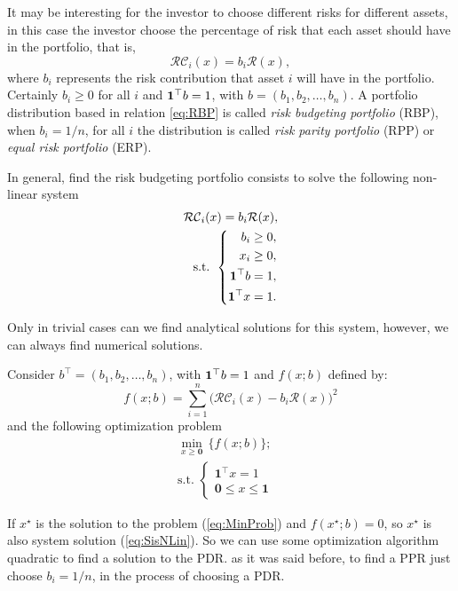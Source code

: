 It may be interesting for the investor to choose different risks for different assets, in this case the investor choose the percentage of risk that each asset should have in the portfolio, that is,
\begin{equation}\label{eq:RBP}
	\mathcal{RC}_i(x)=b_i\mathcal{R}(x),
\end{equation}
where $b_i$ represents the risk contribution that asset $i$ will have in the portfolio. Certainly $b_i\geq 0$ for all $i$ and
${\bf 1}^\top b =1$, with $b=(b_1, b_2, \dots, b_n)$. A portfolio distribution based in relation \eqref{eq:RBP} is called \textit{risk budgeting portfolio} (RBP), when $b_i=1/n$, for all $i$ the distribution is called \textit{risk parity portfolio} (RPP) or \textit{equal risk portfolio} (ERP).

In general, find the risk budgeting portfolio consists to solve the following non-linear system
\begin{eqnarray}\label{eq:SisNLin}
\mathcal{RC}_i(x)=b_i\mathcal{R}(x), \\
	\mbox{s.t. }\left\{
	\begin{aligned}\nonumber
b_i \geq 0, \\
x_i \geq 0, \\
{\bf 1}^\top b =1, \\
{\bf 1}^\top x =1.
	\end{aligned}
	\right.
\end{eqnarray}




Only in trivial cases can we find analytical solutions for this system, however, we can always find numerical solutions.

Consider $b^\top = (b_1, b_2, \dots, b_n)$, with ${\bf 1}^\top b =1$ and $f(x;b)$ defined by:
\[
f(x;b) = \sum_{i=1}^n \big(\mathcal{RC}_i(x) -b_i\mathcal{R}(x)\Big)^2
\] and the following optimization problem
\begin{eqnarray}\label{eq:MinProb}
\min_{x\geq \textbf{0}}\, \{f(x;b)\}; \\
	\mbox{s.t. }\left\{
	\begin{aligned}\nonumber
		\mathbf{1}^\top x=1 & \\
		\mathbf{0}\leq x \leq \mathbf{1}
	\end{aligned}
	\right.
\end{eqnarray}

If $x^\star$ is the solution to the problem (\ref{eq:MinProb}) and
$f(x^\star;b)=0$, so $x^\star$ is also system solution
(\ref{eq:SisNLin}). So we can use some optimization algorithm
quadratic to find a solution to the PDR. as it was
said before, to find a PPR just choose $b_i=1/n$, in the
process of choosing a PDR.

